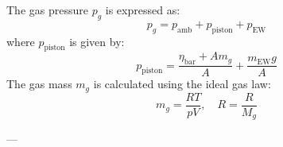The gas pressure \( p_g \) is expressed as:  
\[
p_g = p_{\text{amb}} + p_{\text{piston}} + p_{\text{EW}}
\]  
where \( p_{\text{piston}} \) is given by:  
\[
p_{\text{piston}} = \frac{\eta_{\text{bar}} + A m_g}{A} + \frac{m_{\text{EW}} g}{A}
\]  
The gas mass \( m_g \) is calculated using the ideal gas law:  
\[
m_g = \frac{RT}{pV}, \quad R = \frac{R}{M_g}
\]  

---